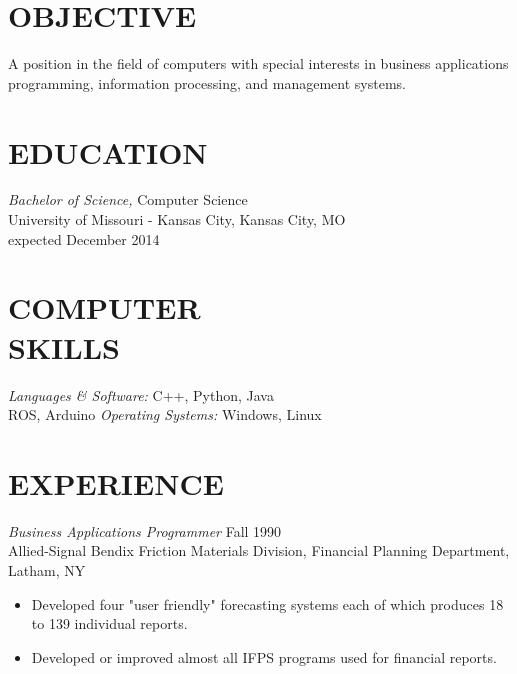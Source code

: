 \documentclass[line,margin]{res}
\begin{document}
\address{11408 Colorado Ave \#12, Kansas City, MO 64137}
\address{(913)235-1070 \textbar \textbar  victoria.chen.wu@gmail.com}

 
\begin{resume}
 
\section{OBJECTIVE}       A position in the field of computers with special 
                interests in business applications programming, 
                information processing, and management systems. 
 
 
\section{EDUCATION} {\sl Bachelor of Science,} Computer Science\\
                University of Missouri - Kansas City, Kansas City, MO \\
                expected December 2014 

\section{COMPUTER \\ SKILLS} {\sl Languages \& Software:} 
		C++, Python, Java \\
		ROS, Arduino
                {\sl Operating Systems:} Windows, Linux 
 
\section{EXPERIENCE} {\sl Business Applications Programmer} \hfill Fall 1990 \\
                Allied-Signal Bendix Friction Materials Division, 
                Financial Planning Department, Latham, NY
                 \begin{itemize}  \itemsep -2pt %
                 \item Developed four "user friendly" forecasting 
                    systems each of which produces 18 to 139 
                    individual reports. 
                \item   Developed or improved almost all IFPS 
                    programs used for financial reports. 
                \end{itemize}
 

\end{resume}
\end{document}
